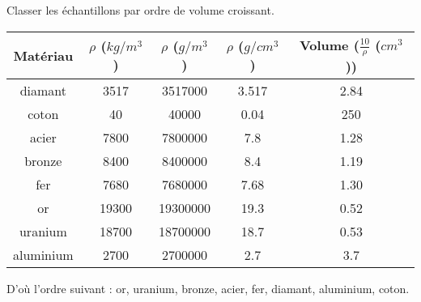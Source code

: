 \begin{questions}
	\question[2] Classer les échantillons par ordre de volume croissant.
	
	\begin{solution}
		{\small \begin{center}
				\begin{tabular}{|@{\ }c@{\ }|@{\ }c@{\ }|@{\ }c@{\ }|@{\ }c@{\ }|@{\ }c@{\ }|}
					\hline
					\textbf{Matériau}  & \textbf{$\rho$ ($kg/m^3$)} & \textbf{$\rho$ ($g/m^3$)} & \textbf{$\rho$ ($g/cm^3$)} & Volume ($\frac{10}{\rho}$ ($cm^3$))   \\ \hline
					diamant   & \num{3517}  & \num{3517000} &  \num{3.517} & \num{2.84} \\ \hline
					coton     & \num{40}    & \num{40000}  & \num{0.04} & \num{250} \\ \hline
					acier     & \num{7800}  & \num{7800000}   & \num{7.8} & \num{1.28} \\ \hline
					bronze    & \num{8400}  & \num{8400000}   & \num{8.4} & \num{1.19} \\ \hline
					fer       & \num{7680}  & \num{7680000}  & \num{7.68} & \num{1.30} \\ \hline
					or        & \num{19300} & \num{19300000}  & \num{19.3} & \num{0.52} \\ \hline
					uranium   & \num{18700} & \num{18700000}  & \num{18.7} & \num{0.53} \\ \hline
					aluminium & \num{2700} & \num{2700000}    & \num{2.7} & \num{3.7} \\ \hline
				\end{tabular}
		\end{center}}
	
	D'où l'ordre suivant : or, uranium, bronze, acier, fer, diamant, aluminium, coton.
	\end{solution}
	
\end{questions}